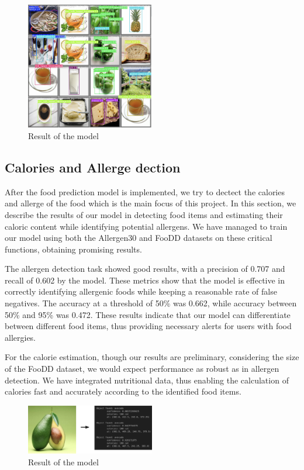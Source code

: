 \documentclass[10pt,twocolumn,letterpaper]{article}
\begin{document}
\begin{figure}[htbp]
    \centering
    \includegraphics[width=0.5\textwidth]{result3.png}
    \caption{Result of the model}
\end{figure}

\subsection{Calories and Allerge dection}
After the food prediction model is implemented, we try to dectect the calories and allerge of the food which is the main focus of this project. 
In this section, we describe the results of our model in detecting food items and estimating their caloric content while identifying potential allergens. We have managed to train our model using both the Allergen30 and FooDD datasets on these critical functions, obtaining promising results.

The allergen detection task showed good results, with a precision of 0.707 and recall of 0.602 by the model. These metrics show that the model is effective in correctly identifying allergenic foods while keeping a reasonable rate of false negatives. The accuracy at a threshold of 50\% was 0.662, while accuracy between 50\% and 95\% was 0.472. These results indicate that our model can differentiate between different food items, thus providing necessary alerts for users with food allergies.

For the calorie estimation, though our results are preliminary, considering the size of the FooDD dataset, we would expect performance as robust as in allergen detection. We have integrated nutritional data, thus enabling the calculation of calories fast and accurately according to the identified food items.
\begin{figure}[htbp]
    \centering
    \includegraphics[width=0.5\textwidth]{predict_result.png}
    \caption{Result of the model}
\end{figure}
\end{document}
